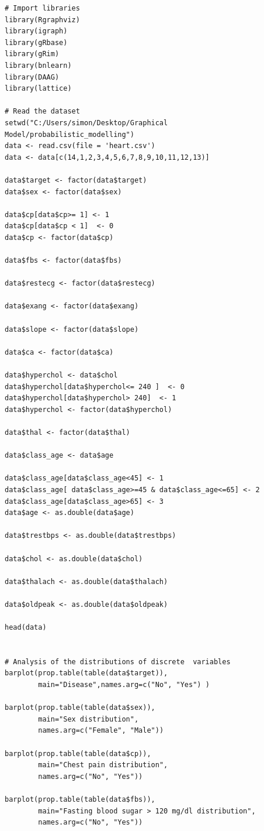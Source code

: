 \documentclass{article}
\begin{document}
\begin{verbatim}
# Import libraries
library(Rgraphviz)
library(igraph)
library(gRbase)
library(gRim)
library(bnlearn)
library(DAAG)
library(lattice)

# Read the dataset
setwd("C:/Users/simon/Desktop/Graphical Model/probabilistic_modelling")
data <- read.csv(file = 'heart.csv')
data <- data[c(14,1,2,3,4,5,6,7,8,9,10,11,12,13)]

data$target <- factor(data$target)
data$sex <- factor(data$sex)

data$cp[data$cp>= 1] <- 1
data$cp[data$cp < 1]  <- 0
data$cp <- factor(data$cp)

data$fbs <- factor(data$fbs)

data$restecg <- factor(data$restecg)

data$exang <- factor(data$exang)

data$slope <- factor(data$slope)

data$ca <- factor(data$ca)

data$hyperchol <- data$chol
data$hyperchol[data$hyperchol<= 240 ]  <- 0
data$hyperchol[data$hyperchol> 240]  <- 1
data$hyperchol <- factor(data$hyperchol)

data$thal <- factor(data$thal)

data$class_age <- data$age

data$class_age[data$class_age<45] <- 1
data$class_age[ data$class_age>=45 & data$class_age<=65] <- 2
data$class_age[data$class_age>65] <- 3
data$age <- as.double(data$age)

data$trestbps <- as.double(data$trestbps)

data$chol <- as.double(data$chol)

data$thalach <- as.double(data$thalach)

data$oldpeak <- as.double(data$oldpeak)

head(data)


# Analysis of the distributions of discrete  variables
barplot(prop.table(table(data$target)),
        main="Disease",names.arg=c("No", "Yes") )
        
barplot(prop.table(table(data$sex)), 
        main="Sex distribution",  
        names.arg=c("Female", "Male"))
        
barplot(prop.table(table(data$cp)),
        main="Chest pain distribution",  
        names.arg=c("No", "Yes"))
        
barplot(prop.table(table(data$fbs)), 
        main="Fasting blood sugar > 120 mg/dl distribution",  
        names.arg=c("No", "Yes"))
        

\end{verbatim}
\end{document}
